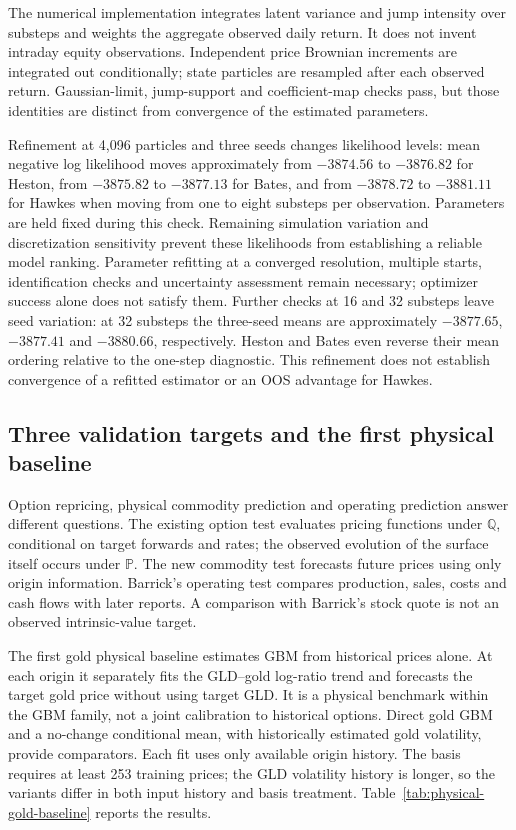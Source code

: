 The numerical implementation integrates latent variance and jump intensity
over substeps and weights the aggregate observed daily return. It does not
invent intraday equity observations. Independent price Brownian increments
are integrated out conditionally; state particles are resampled after each
observed return. Gaussian-limit, jump-support and coefficient-map checks
pass, but those identities are distinct from convergence of the estimated
parameters.

Refinement at 4,096 particles and three seeds changes likelihood levels:
mean negative log likelihood moves approximately from $-3874.56$ to
$-3876.82$ for Heston, from $-3875.82$ to $-3877.13$ for Bates, and from
$-3878.72$ to $-3881.11$ for Hawkes when moving from one to eight substeps
per observation. Parameters are held fixed during this check. Remaining
simulation variation and discretization sensitivity prevent these likelihoods
from establishing a reliable model ranking. Parameter refitting at a
converged resolution, multiple starts, identification checks and uncertainty
assessment remain necessary; optimizer success alone does not satisfy them.
Further checks at 16 and 32 substeps leave seed variation: at 32 substeps
the three-seed means are approximately $-3877.65$, $-3877.41$ and
$-3880.66$, respectively. Heston and Bates even reverse their mean ordering
relative to the one-step diagnostic. This refinement does not establish
convergence of a refitted estimator or an OOS advantage for Hawkes.

\subsection{Three validation targets and the first physical baseline}
\label{sec:physical-validation-targets}

Option repricing, physical commodity prediction and operating prediction
answer different questions. The existing option test evaluates pricing
functions under $\mathbb Q$, conditional on target forwards and rates;
the observed evolution of the surface itself occurs under $\mathbb P$.
The new commodity test forecasts future prices using only origin information.
Barrick's operating test compares production, sales, costs and cash flows
with later reports. A comparison with Barrick's stock quote is not an
observed intrinsic-value target.

The first gold physical baseline estimates GBM from historical prices alone.
At each origin it separately fits the GLD--gold log-ratio trend and forecasts
the target gold price without using target GLD. It is a physical benchmark
within the GBM family, not a joint calibration to historical options. Direct
gold GBM and a no-change conditional mean, with historically estimated gold
volatility, provide comparators. Each fit uses only available origin history.
The basis requires at least 253 training prices; the GLD volatility history
is longer, so the variants differ in both input history and basis treatment.
Table~\ref{tab:physical-gold-baseline} reports the results.

